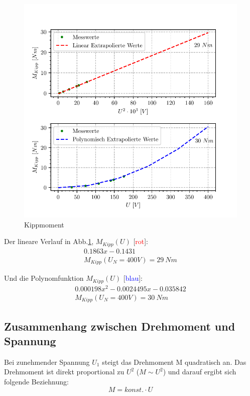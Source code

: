 \documentclass[conference]{IEEEtran}
\begin{document}
\vspace{-7ex}
\begin{figure}[htbp]
    \centering
    \includegraphics[width=\columnwidth]{./kippmoment.pdf}
    \caption{Kippmoment}
    \label{fig:Kippmoment}
\end{figure}

Der lineare Verlauf in Abb.\ref{fig:Kippmoment}, $M_{\textit{Kipp}}(U)$ [\textcolor{red}{rot}]:
\begin{gather*}
    0.1863 x - 0.1431\\
    M_{Kipp}(U_N=400V)=29 \ Nm
\end{gather*}

Und die Polynomfunktion $M_{\textit{Kipp}}(U)$ [\textcolor{blue}{blau}]:
\begin{gather*}
    0.000198 x^2 - 0.0024495 x -0.035842\\
    M_{Kipp}(U_N=400V)=30\ Nm
\end{gather*}



\subsection{Zusammenhang zwischen Drehmoment und Spannung}

Bei zunehmender Spannung $U_1$ steigt das Drehmoment M quadratisch an. Das
Drehmoment ist direkt proportional zu $U^2$ ($M \sim U^2$) und darauf ergibt sich
folgende Beziehnung: \[ M = \textit{konst.} \cdot U \]
\end{document}
